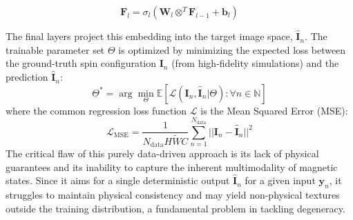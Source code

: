 \documentclass[letterpaper, 12, one column]{article}
\begin{document}
\begin{equation}
\label{eq:transposed_conv_feature}
\mathbf{F}_l = \sigma_l(\mathbf{W}_l \otimes^T \mathbf{F}_{l-1} + \mathbf{b}_l)
\end{equation}

The final layers project this embedding into the target image space, $\mathbf{\hat{I}}_n$. The trainable parameter set $\Theta$ is optimized by minimizing the expected loss between the ground-truth spin configuration $\mathbf{I}_n$ (from high-fidelity simulations) and the prediction $\mathbf{\hat{I}}_n$:
\begin{equation}
\label{eq:theta_optimization}
\Theta^{*} = \arg \min_{\Theta} \mathbb{E}[\mathcal{L}(\mathbf{I}_n, \mathbf{\hat{I}}_n | \Theta) : \forall n \in \mathbb{N}]
\end{equation}
where the common regression loss function $\mathcal{L}$ is the Mean Squared Error (MSE):
\begin{equation}
\label{eq:mse_loss_surrogate}
\mathcal{L}_{\text{MSE}} = \frac{1}{N_{\text{data}} H \tilde{W} C} \sum_{n=1}^{N_{\text{data}}} || \mathbf{I}_n - \mathbf{\hat{I}}_n ||^2
\end{equation}
The critical flaw of this purely data-driven approach is its lack of physical guarantees and its inability to capture the inherent multimodality of magnetic states. Since it aims for a single deterministic output $\mathbf{\hat{I}}_n$ for a given input $\mathbf{y}_n$, it struggles to maintain physical consistency and may yield non-physical textures outside the training distribution, a fundamental problem in tackling degeneracy.
\end{document}
